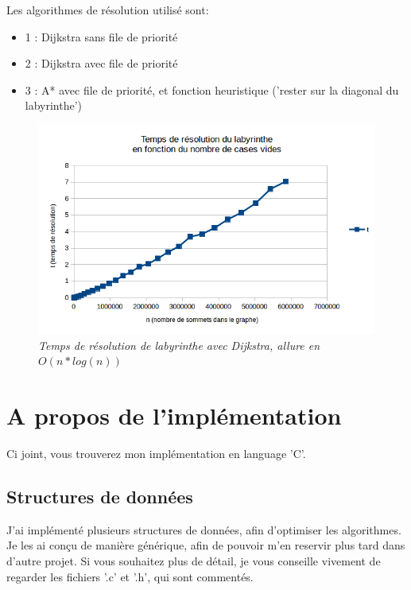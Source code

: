 \documentclass[10pt]{article}
\begin{document}
		Les algorithmes de résolution utilisé sont:
		
		\begin{itemize}[label=-]
			\setlength\itemsep{0.1em}
			\item 1 : Dijkstra sans file de priorité
			\item 2 : Dijkstra avec file de priorité
				\item 3 : A* avec file de priorité, et fonction heuristique ('rester sur la diagonal du labyrinthe')
		\end{itemize}
			
		\begin{figure}[H]
			\begin{center}
				\includegraphics[width=12cm,height=\textheight,keepaspectratio]{./images/courbe_temps.png}
			\end{center}
			\caption{\textit{Temps de résolution de labyrinthe avec Dijkstra, allure en \(O(n * log(n))\)}}
		\end{figure}

	\newpage
	\section{A propos de l'implémentation}
		Ci joint, vous trouverez mon implémentation en language 'C'.
		\subsection{Structures de données}
		J'ai implémenté plusieurs structures de données, afin d'optimiser les algorithmes. Je les ai conçu de manière générique,
		afin de pouvoir m'en reservir plus tard dans d'autre projet. Si vous souhaitez plus de détail, je vous
		conseille vivement de regarder les fichiers '.c' et '.h', qui sont commentés.
		
\end{document}
